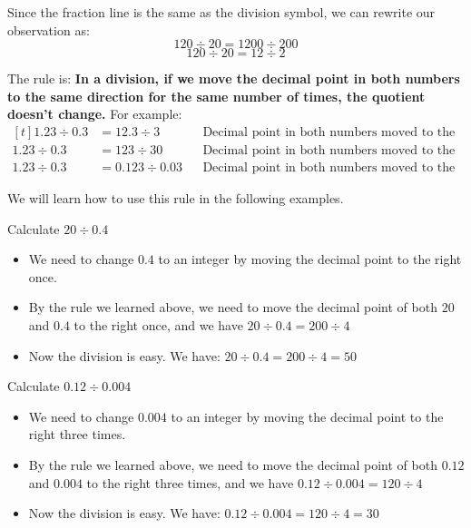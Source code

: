 Since the fraction line is the same as the division symbol, we can rewrite our observation as:
\[ 120\div20=1200\div200 \]
\[ 120\div20=12\div2 \]

The rule is: \textbf{In a division, if we move the decimal point in both numbers to the same direction for the same number of times, the quotient doesn't change.} For example:
\[
\begin{aligned}[t]
	1.23 \div 0.3 &= 12.3 \div 3 &&\text{Decimal point in both numbers moved to the right once.} \\
	1.23 \div 0.3 &= 123 \div 30 &&\text{Decimal point in both numbers moved to the right twice.} \\
	1.23 \div 0.3 &= 0.123 \div 0.03 &&\text{Decimal point in both numbers moved to the left once.}
\end{aligned}
\]

We will learn how to use this rule in the following examples.

\begin{myexample}
Calculate $20\div0.4$
\end{myexample}
\begin{solution}
\begin{itemize}
\item We need to change $0.4$ to an integer by moving the decimal point to the right once.
\item By the rule we learned above, we need to move the decimal point of both $20$ and $0.4$ to the right once, and we have $20\div0.4=200\div4$
\item Now the division is easy. We have: $20\div0.4=200\div4=50$
\end{itemize}
\end{solution}

\begin{myexample}
Calculate $0.12\div0.004$
\end{myexample}
\begin{solution}
\begin{itemize}
\item We need to change $0.004$ to an integer by moving the decimal point to the right three times.
\item By the rule we learned above, we need to move the decimal point of both $0.12$ and $0.004$ to the right three times, and we have $0.12\div0.004=120\div4$
\item Now the division is easy. We have: $0.12\div0.004=120\div4=30$
\end{itemize}
\end{solution}

